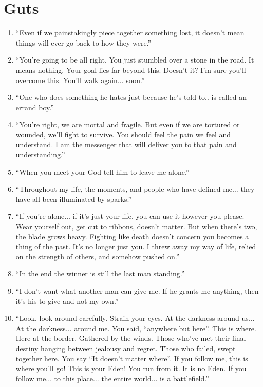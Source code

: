 \documentclass{book}
\numberwithin{equation}{section}
\begin{document}
\section{Guts}
\begin{enumerate}
    \item ``Even if we painstakingly piece together something lost, it doesn't mean things will ever go back to how they were.''
    \item ``You're going to be all right. You just stumbled over a stone in the road. It means nothing. Your goal lies far beyond this. Doesn't it? I'm sure you'll overcome this. You'll walk again$\ldots$ soon.''
    \item ``One who does something he hates just because he's told to.. is called an errand boy.''
    \item ``You're right, we are mortal and fragile. But even if we are tortured or wounded, we'll fight to survive. You should feel the pain we feel and understand. I am the messenger that will deliver you to that pain and understanding.''
    \item ``When you meet your God tell him to leave me alone.''
    \item ``Throughout my life, the moments, and people who have defined me$\ldots$ they have all been illuminated by sparks.''
    \item ``If you're alone$\ldots$ if it's just your life, you can use it however you please. Wear yourself out, get cut to ribbons, doesn't matter. But when there's two, the blade grows heavy. Fighting like death doesn't concern you becomes a thing of the past. It's no longer just you. I threw away my way of life, relied on the strength of others, and somehow pushed on.''
    \item ``In the end the winner is still the last man standing.''
    \item ``I don't want what another man can give me. If he grants me anything, then it's his to give and not my own.''
    \item ``Look, look around carefully. Strain your eyes. At the darkness around us$\ldots$ At the darkness$\ldots$ around me. You said, ``anywhere but here''. This is where. Here at the border. Gathered by the winds. Those who've met their final destiny hanging between jealousy and regret. Those who failed, swept together here. You say ``It doesn't matter where''. If you follow me, this is where you'll go! This is your Eden! You run from it. It is no Eden. If you follow me$\ldots$ to this place$\ldots$ the entire world$\ldots$ is a battlefield.''

\end{enumerate}
\end{document}
